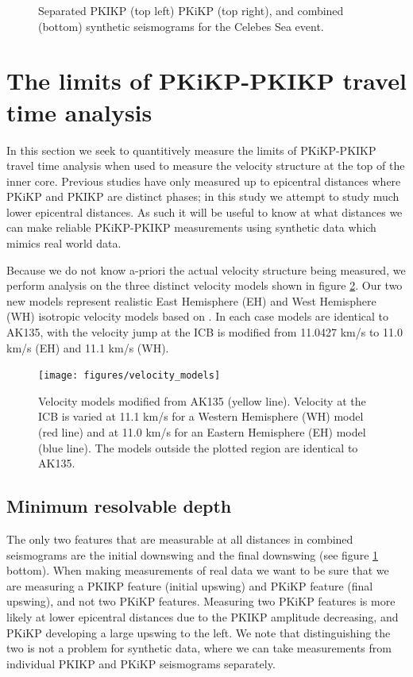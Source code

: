 \documentclass[11pt,a4paper]{article}
\begin{document}
\begin{figure}
	\caption{Separated PKIKP (top left) PKiKP (top right), and combined (bottom) synthetic seismograms for the Celebes Sea event.}
	\label{fig:Synth aligned}
\end{figure}

\section{The limits of PKiKP-PKIKP travel time analysis}
\label{sec:Limits}

In this section we seek to quantitively measure the limits of PKiKP-PKIKP travel time analysis when used to measure the velocity structure at the top of the inner core. Previous studies have only measured up to epicentral distances where PKiKP and PKIKP are distinct phases; in this study we attempt to study much lower epicentral distances. As such it will be useful to know at what distances we can make reliable PKiKP-PKIKP measurements using synthetic data which mimics real world data.

Because we do not know a-priori the actual velocity structure being measured, we perform analysis on the three distinct velocity models shown in figure \ref{fig:Velocity models}. Our two new models represent realistic East Hemisphere (EH) and West Hemisphere (WH) isotropic velocity models based on \cite{Waszek2011a}. In each case models are identical to AK135, with the velocity jump at the ICB is modified from 11.0427 km/s to 11.0 km/s (EH) and 11.1 km/s (WH).

\begin{figure}
	\centering
	\texttt{[image: figures/velocity\_models]}
	\caption{Velocity models modified from AK135 (yellow line). Velocity at the ICB is varied at 11.1 km/s for a Western Hemisphere (WH) model (red line) and at 11.0 km/s for an Eastern Hemisphere (EH) model (blue line). The models outside the plotted region are identical to AK135.}
	\label{fig:Velocity models}
\end{figure}

\subsection{Minimum resolvable depth}
The only two features that are measurable at all distances in combined seismograms are the initial downswing and the final downswing (see figure \ref{fig:Synth aligned} bottom). When making measurements of real data we want to be sure that we are measuring a PKIKP feature (initial upswing) and PKiKP feature (final upswing), and not two PKiKP features. Measuring two PKiKP features is more likely at lower epicentral distances due to the PKIKP amplitude decreasing, and PKiKP developing a large upswing to the left. We note that distinguishing the two is not a problem for synthetic data, where we can take measurements from individual PKIKP and PKiKP seismograms separately.
\end{document}
